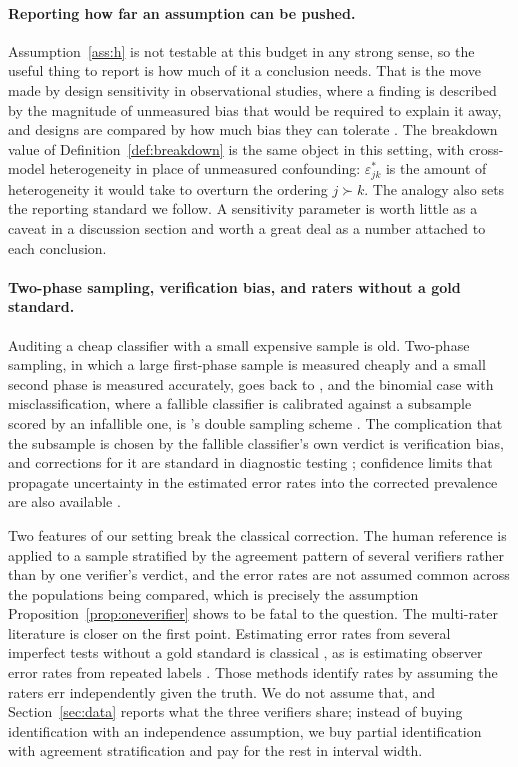 \paragraph{Reporting how far an assumption can be pushed.}
Assumption~\ref{ass:h} is not testable at this budget in any strong sense, so the useful thing
to report is how much of it a conclusion needs. That is the move made by design sensitivity in
observational studies, where a finding is described by the magnitude of unmeasured bias that
would be required to explain it away, and designs are compared by how much bias they can
tolerate \citep{rosenbaum2004design}. The breakdown value of
Definition~\ref{def:breakdown} is the same object in this setting, with cross-model
heterogeneity in place of unmeasured confounding: $\varepsilon^{*}_{jk}$ is the amount of
heterogeneity it would take to overturn the ordering $j \succ k$. The analogy also sets the
reporting standard we follow. A sensitivity parameter is worth little as a caveat in a
discussion section and worth a great deal as a number attached to each conclusion.

\paragraph{Two-phase sampling, verification bias, and raters without a gold standard.}
Auditing a cheap classifier with a small expensive sample is old. Two-phase sampling, in which
a large first-phase sample is measured cheaply and a small second phase is measured accurately,
goes back to \citet{neyman1938contribution}, and the binomial case with misclassification,
where a fallible classifier is calibrated against a subsample scored by an infallible one, is
\citeauthor{tenenbein1970double}'s double sampling scheme \citep{tenenbein1970double}.
The complication that the subsample is chosen by the fallible classifier's own verdict is
verification bias, and corrections for it are standard in diagnostic testing
\citep{begg1983assessment}; confidence limits that propagate uncertainty in the estimated
error rates into the corrected prevalence are also available \citep{lang2014confidence}.

Two features of our setting break the classical correction. The human reference is applied
to a sample stratified by the agreement pattern of several verifiers rather than by one
verifier's verdict, and the error rates are not assumed common across the populations being
compared, which is precisely the assumption Proposition~\ref{prop:oneverifier} shows to be
fatal to the question. The multi-rater literature is closer on the first point. Estimating
error rates from several imperfect tests without a gold standard is classical
\citep{hui1980estimating}, as is estimating observer error rates from repeated labels
\citep{dawid1979maximum}. Those methods identify rates by assuming the raters err
independently given the truth. We do not assume that, and Section~\ref{sec:data} reports what
the three verifiers share; instead of buying identification with an independence assumption,
we buy partial identification with agreement stratification and pay for the rest in interval
width.

